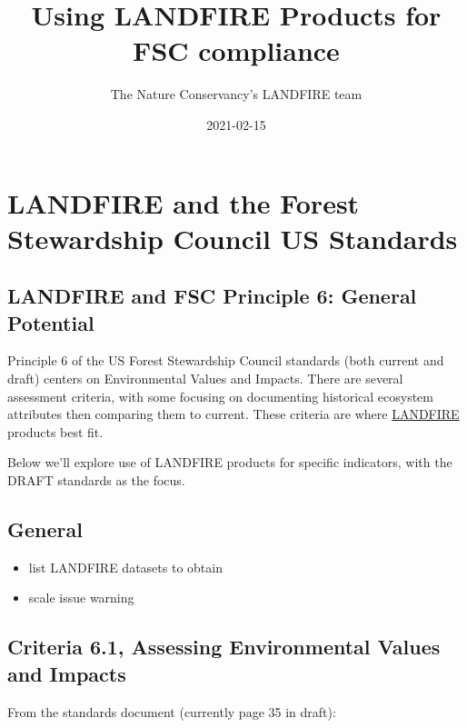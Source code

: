 \documentclass[
]{book}
\title{Using LANDFIRE Products for FSC compliance}
\author{The Nature Conservancy's LANDFIRE team}
\date{2021-02-15}
\providecommand{\tightlist}{%
  \setlength{\itemsep}{0pt}\setlength{\parskip}{0pt}}
\begin{document}
\maketitle

{
\setcounter{tocdepth}{1}
\tableofcontents
}
\hypertarget{landfire-and-the-forest-stewardship-council-us-standards}{%
\chapter{LANDFIRE and the Forest Stewardship Council US Standards}\label{landfire-and-the-forest-stewardship-council-us-standards}}

\hypertarget{landfire-and-fsc-principle-6-general-potential}{%
\section{LANDFIRE and FSC Principle 6: General Potential}\label{landfire-and-fsc-principle-6-general-potential}}

Principle 6 of the US Forest Stewardship Council standards (both current and draft) centers on Environmental Values and Impacts. There are several assessment criteria, with some focusing on documenting historical ecosystem attributes then comparing them to current. These criteria are where \href{www.landfire.gov}{LANDFIRE} products best fit.

Below we'll explore use of LANDFIRE products for specific indicators, with the DRAFT standards as the focus.

\hypertarget{general}{%
\section{General}\label{general}}

\begin{itemize}
\tightlist
\item
  list LANDFIRE datasets to obtain
\item
  scale issue warning
\end{itemize}

\hypertarget{criteria-6.1-assessing-environmental-values-and-impacts}{%
\section{Criteria 6.1, Assessing Environmental Values and Impacts}\label{criteria-6.1-assessing-environmental-values-and-impacts}}

From the standards document (currently page 35 in draft):
\end{document}
